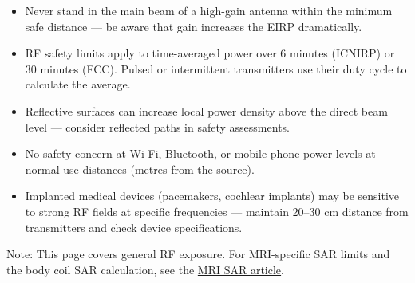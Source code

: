       
\begin{itemize}

        \item Never stand in the main beam of a high-gain antenna within the minimum safe distance — be aware that gain increases the EIRP dramatically.

        \item RF safety limits apply to time-averaged power over 6 minutes (ICNIRP) or 30 minutes (FCC). Pulsed or intermittent transmitters use their duty cycle to calculate the average.

        \item Reflective surfaces can increase local power density above the direct beam level — consider reflected paths in safety assessments.

        \item No safety concern at Wi-Fi, Bluetooth, or mobile phone power levels at normal use distances (metres from the source).

        \item Implanted medical devices (pacemakers, cochlear implants) may be sensitive to strong RF fields at specific frequencies — maintain 20–30 cm distance from transmitters and check device specifications.

      
\end{itemize}

      Note: This page covers general RF exposure. For MRI-specific SAR limits and the body coil SAR calculation, see the \href{https://rftoolbox.ca/wiki_sar.html}{MRI SAR article}.



